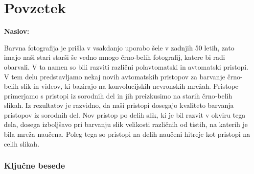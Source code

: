 \chapter*{Povzetek}

\noindent\textbf{Naslov:} \ttitle
\bigskip

Barvna fotografija je prišla v vsakdanjo uporabo šele v zadnjih 50 letih, zato imajo naši stari starši še vedno mnogo črno-belih fotografij, katere bi radi obarvali. V ta namen so bili razviti različni polavtomatski in avtomatski pristopi.
V tem delu predstavljamo nekaj novih avtomatskih pristopov za barvanje črno-belih slik in videov, ki bazirajo na konvolucijskih nevronskih mrežah. Pristope primerjamo s pristopi iz sorodnih del in jih preizkusimo na starih črno-belih slikah. 
Iz rezultatov je razvidno, da naši pristopi dosegajo kvaliteto barvanja pristopov iz sorodnih del. Nov pristop po delih slik, ki je bil razvit v okviru tega dela, dosega izboljšavo pri barvanju slik velikosti različnih od tistih, na katerih je bila mreža naučena. Poleg tega so pristopi na delih naučeni hitreje kot pristopi na celih slikah. 

\subsection*{Ključne besede}
\textit{\tkeywords}
\clearemptydoublepage
